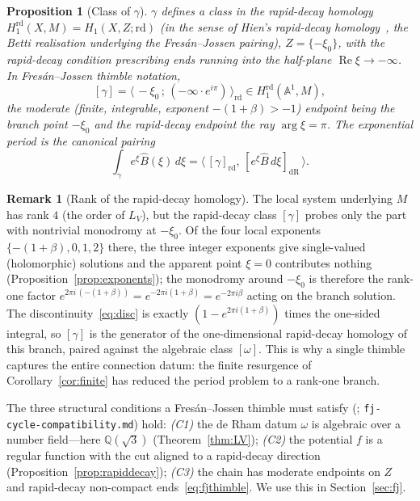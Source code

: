 \documentclass[11pt,reqno]{amsart}
\theoremstyle{plain}
\newtheorem{proposition}[theorem]{Proposition}
\theoremstyle{definition}
\newtheorem{remark}[theorem]{Remark}
\newcommand{\Bhat}{\widehat{B}}
\newcommand{\LV}{L_{V}}
\newcommand{\Qsqrt}{\mathbb{Q}(\sqrt3)}
\newcommand{\xizero}{\xi_0}
\begin{document}
\begin{proposition}[Class of $\gamma$]\label{prop:fjclass}
$\gamma$ defines a class in the rapid-decay homology
$H_1^{\mathrm{rd}}(X,M)=H_1(X,Z;\mathrm{rd})$ (in the sense of Hien's rapid-decay
homology~\cite{Hien}, the Betti realisation underlying the Fres\'an--Jossen pairing), $Z=\{-\xizero\}$, with the rapid-decay condition
prescribing ends running into the half-plane $\operatorname{Re}\xi\to-\infty$. In Fres\'an--Jossen
thimble notation,
\begin{equation}\label{eq:fjthimble}
  [\gamma]=\bigl\langle\,-\xizero\,;\,(-\infty\cdot e^{i\pi})\,\bigr\rangle_{\mathrm{rd}}
  \in H_1^{\mathrm{rd}}(\mathbb{A}^1,M),
\end{equation}
the moderate (finite, integrable, exponent $-(1+\beta)>-1$) endpoint being the branch point
$-\xizero$ and the rapid-decay endpoint the ray $\arg\xi=\pi$. The exponential period is the
canonical pairing
\begin{equation}\label{eq:fjpairing}
  \int_\gamma e^{\xi}\Bhat(\xi)\,d\xi
  =\bigl\langle\,[\gamma]_{\mathrm{rd}},\,[e^{\xi}\Bhat\,d\xi]_{\mathrm{dR}}\,\bigr\rangle .
\end{equation}
\end{proposition}

\begin{remark}[Rank of the rapid-decay homology]\label{rmk:rank}
The local system underlying $M$ has rank $4$ (the order of $\LV$), but the rapid-decay class
$[\gamma]$ probes only the part with nontrivial monodromy at $-\xizero$. Of the four local
exponents $\{-(1+\beta),0,1,2\}$ there, the three integer exponents give single-valued
(holomorphic) solutions and the apparent point $\xi=0$ contributes nothing
(Proposition~\ref{prop:exponents}); the monodromy around $-\xizero$ is therefore the rank-one
factor $e^{2\pi i\,(-(1+\beta))}=e^{-2\pi i(1+\beta)}=e^{-2\pi i\beta}$ acting on the branch
solution. The discontinuity~\eqref{eq:disc} is exactly $(1-e^{2\pi i(1+\beta)})$ times the
one-sided integral, so $[\gamma]$ is the generator of the one-dimensional rapid-decay homology of
this branch, paired against the algebraic class $[\omega]$. This is why a single thimble captures
the entire connection datum: the finite resurgence of Corollary~\ref{cor:finite} has reduced the
period problem to a rank-one branch.
\end{remark}

The three structural conditions a Fres\'an--Jossen thimble must satisfy
(\cite{FJ}; \texttt{fj-cycle-compatibility.md}) hold: \emph{(C1)} the de Rham datum $\omega$ is
algebraic over a number field---here $\Qsqrt$ (Theorem~\ref{thm:LV}); \emph{(C2)} the potential $f$
is a regular function with the cut aligned to a rapid-decay direction
(Proposition~\ref{prop:rapiddecay}); \emph{(C3)} the chain has moderate endpoints on $Z$ and
rapid-decay non-compact ends~\eqref{eq:fjthimble}. We use this in Section~\ref{sec:fj}.
\end{document}
